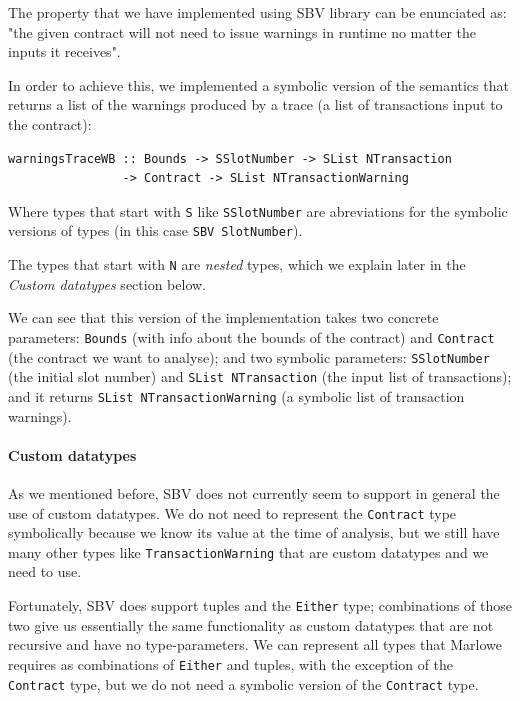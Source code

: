 \documentclass[runningheads]{llncs}
\begin{document}
The property that we have implemented using SBV library can be enunciated as: "the given contract will not need to issue warnings in runtime no matter the inputs it receives".

In order to achieve this, we implemented a symbolic version of the semantics that returns a list of the warnings produced by a trace (a list of transactions input to the contract):

\begin{verbatim}
warningsTraceWB :: Bounds -> SSlotNumber -> SList NTransaction
                -> Contract -> SList NTransactionWarning
\end{verbatim}

Where types that start with \texttt{S} like \texttt{SSlotNumber} are abreviations for the symbolic versions of types (in this case \texttt{SBV SlotNumber}).

The types that start with \texttt{N} are \textit{nested} types, which we explain later in the \textit{Custom datatypes} section below.

We can see that this version of the implementation takes two concrete parameters: \texttt{Bounds} (with info about the bounds of the contract) and \texttt{Contract} (the contract we want to analyse); and two symbolic parameters: \texttt{SSlotNumber} (the initial slot number) and \texttt{SList NTransaction} (the input list of transactions); and it returns \texttt{SList NTransactionWarning} (a symbolic list of transaction warnings).

\paragraph{Custom datatypes}

As we mentioned before, SBV does not currently seem to support in general the use of custom datatypes. We do not need to represent the \texttt{Contract} type symbolically because we know its value at the time of analysis, but we still have many other types like \texttt{TransactionWarning} that are custom datatypes and we need to use.

Fortunately, SBV does support tuples and the \texttt{Either} type; combinations of those two give us essentially the same functionality as custom datatypes that are not recursive and have no type-parameters. We can represent all types that Marlowe requires as combinations of \texttt{Either} and tuples, with the exception of the \texttt{Contract} type, but we do not need a symbolic version of the \texttt{Contract} type.
\end{document}
